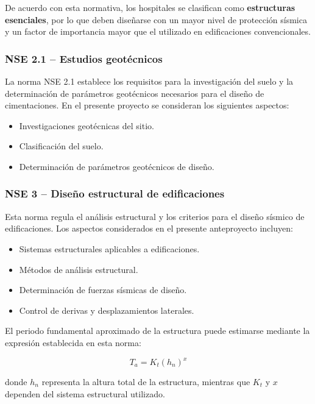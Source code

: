 \documentclass[14pt,letterpaper]{extarticle}
\begin{document}
	De acuerdo con esta normativa, los hospitales se clasifican como \textbf{estructuras esenciales}, por lo que deben diseñarse con un mayor nivel de protección sísmica y un factor de importancia mayor que el utilizado en edificaciones convencionales.
	
	\subsubsection{NSE 2.1 -- Estudios geotécnicos}
	
	La norma NSE 2.1 establece los requisitos para la investigación del suelo y la determinación de parámetros geotécnicos necesarios para el diseño de cimentaciones. En el presente proyecto se consideran los siguientes aspectos:
	
	\begin{itemize}
		\item Investigaciones geotécnicas del sitio.
		\item Clasificación del suelo.
		\item Determinación de parámetros geotécnicos de diseño.
	\end{itemize}
	
	\subsubsection{NSE 3 -- Diseño estructural de edificaciones}
	
	Esta norma regula el análisis estructural y los criterios para el diseño sísmico de edificaciones. Los aspectos considerados en el presente anteproyecto incluyen:
	
	\begin{itemize}
		\item Sistemas estructurales aplicables a edificaciones.
		\item Métodos de análisis estructural.
		\item Determinación de fuerzas sísmicas de diseño.
		\item Control de derivas y desplazamientos laterales.
	\end{itemize}
	
	El periodo fundamental aproximado de la estructura puede estimarse mediante la expresión establecida en esta norma:
	
	\[
	T_a = K_t (h_n)^x
	\]
	
	donde $h_n$ representa la altura total de la estructura, mientras que $K_t$ y $x$ dependen del sistema estructural utilizado.
	
\end{document}
